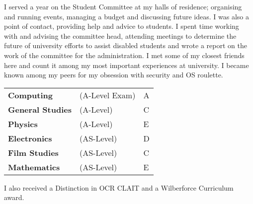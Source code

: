\documentclass[10pt,a4paper]{moderncv}
\begin{document}
\small{}
\small{}
{I served a year on the Student Committee at my halls of residence; organising and running events, managing a budget and discussing future ideas. I was also a point of contact, providing help and advice to students.}
{I spent time working with and advising the committee head, attending meetings to determine the future of university efforts to assist disabled students and wrote a report on the work of the committee for the administration.}
{I met some of my closest friends here and count it among my most important experiences at university. I became known among my peers for my obsession with security and OS roulette.
\newline{}
}

{
	\begin{tabularx}{\textwidth}{ X X X }
		\textbf{Computing} & (A-Level Exam) & A\\
		\textbf{General Studies} & (A-Level) & C\\
		\textbf{Physics} & (A-Level) & E\\
		\textbf{Electronics} & (AS-Level) & D\\
		\textbf{Film Studies} & (AS-Level) & C\\
		\textbf{Mathematics} & (AS-Level) & E\\
	\end{tabularx}
	\newline{}\newline{}
	I also received a Distinction in OCR CLAIT and a Wilberforce Curriculum award.
	\newline{}
}
\end{document}
